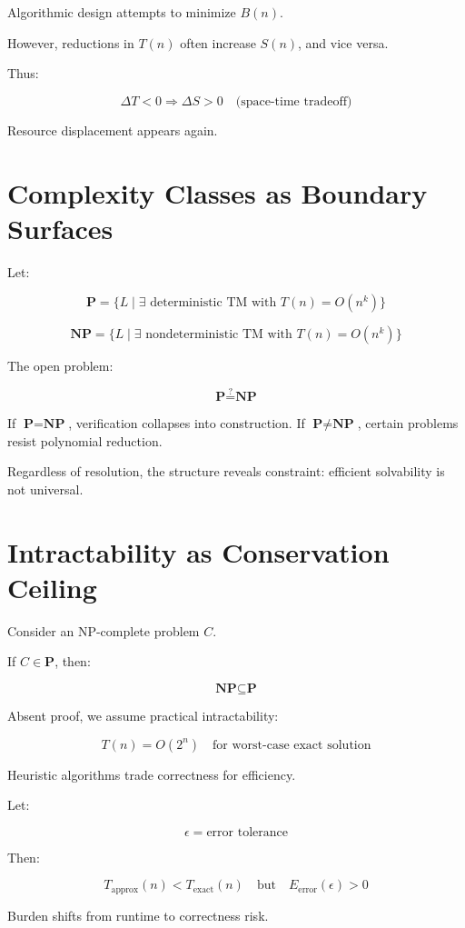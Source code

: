 \documentclass[11pt,openany]{book}
\begin{document}
Algorithmic design attempts to minimize $B(n)$.

However, reductions in $T(n)$ often increase $S(n)$, and vice versa.

Thus:

\[
\Delta T < 0 \Rightarrow \Delta S > 0
\quad \text{(space-time tradeoff)}
\]

Resource displacement appears again.

\section{Complexity Classes as Boundary Surfaces}

Let:

\[
\textbf{P} = \{ L \mid \exists \text{ deterministic TM with } T(n) = O(n^k) \}
\]

\[
\textbf{NP} = \{ L \mid \exists \text{ nondeterministic TM with } T(n) = O(n^k) \}
\]

The open problem:

\[
\textbf{P} \stackrel{?}{=} \textbf{NP}
\]

If $\textbf{P} = \textbf{NP}$, verification collapses into construction.
If $\textbf{P} \neq \textbf{NP}$, certain problems resist polynomial reduction.

Regardless of resolution, the structure reveals constraint:
efficient solvability is not universal.

\section{Intractability as Conservation Ceiling}

Consider an NP-complete problem $C$.

If $C \in \textbf{P}$, then:

\[
\textbf{NP} \subseteq \textbf{P}
\]

Absent proof, we assume practical intractability:

\[
T(n) = O(2^n) \quad \text{for worst-case exact solution}
\]

Heuristic algorithms trade correctness for efficiency.

Let:

\[
\epsilon = \text{error tolerance}
\]

Then:

\[
T_{\text{approx}}(n) < T_{\text{exact}}(n)
\quad \text{but} \quad E_{\text{error}}(\epsilon) > 0
\]

Burden shifts from runtime to correctness risk.
\end{document}
